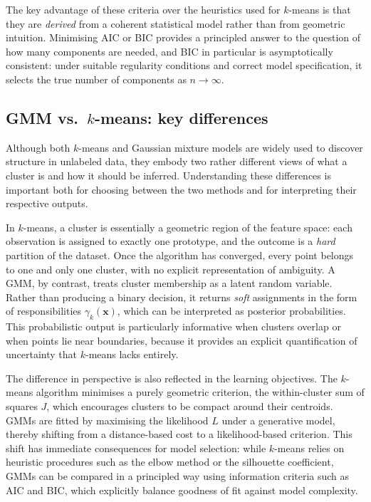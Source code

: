 The key advantage of these criteria over the heuristics used for $k$-means is that they are
\emph{derived} from a coherent statistical model rather than from geometric intuition.
Minimising AIC or BIC provides a principled answer to the question of how many
components are needed, and BIC in particular is asymptotically consistent: under suitable
regularity conditions and correct model specification, it selects the true number of
components as $n\to\infty$.

\subsection*{GMM vs.\ $k$-means: key differences}

Although both $k$-means and Gaussian mixture models are widely used to discover
structure in unlabeled data, they embody two rather different views of what a cluster is and
how it should be inferred. Understanding these differences is important both for choosing
between the two methods and for interpreting their respective outputs.

In $k$-means, a cluster is essentially a geometric region of the feature space: each
observation is assigned to exactly one prototype, and the outcome is a \emph{hard}
partition of the dataset. Once the algorithm has converged, every point belongs to one and
only one cluster, with no explicit representation of ambiguity. A GMM, by contrast, treats
cluster membership as a latent random variable. Rather than producing a binary decision, it
returns \emph{soft} assignments in the form of responsibilities $\gamma_k(\mathbf{x})$,
which can be interpreted as posterior probabilities. This probabilistic output is particularly
informative when clusters overlap or when points lie near boundaries, because it provides
an explicit quantification of uncertainty that $k$-means lacks entirely.

The difference in perspective is also reflected in the learning objectives. The $k$-means
algorithm minimises a purely geometric criterion, the within-cluster sum of squares $J$,
which encourages clusters to be compact around their centroids. GMMs are fitted by
maximising the likelihood $L$ under a generative model, thereby shifting from a
distance-based cost to a likelihood-based criterion. This shift has immediate consequences
for model selection: while $k$-means relies on heuristic procedures such as the elbow
method or the silhouette coefficient, GMMs can be compared in a principled way using
information criteria such as AIC and BIC, which explicitly balance goodness of fit against
model complexity.

